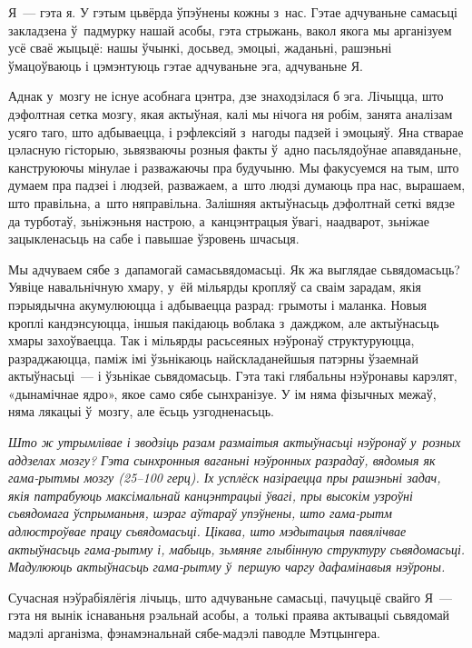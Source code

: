 Я~--- гэта я. У гэтым цьвёрда ўпэўнены кожны з~нас. Гэтае адчуваньне самасьці закладзена ў~падмурку нашай асобы, гэта стрыжань, вакол якога мы арганізуем усё сваё жыцьцё: нашы ўчынкі, досьвед, эмоцыі, жаданьні, рашэньні ўмацоўваюць і цэмэнтуюць гэтае адчуваньне эга, адчуваньне Я.


Аднак у~мозгу не існуе асобнага цэнтра, дзе знаходзілася б эга. Лічыцца, што дэфолтная сетка мозгу, якая актыўная, калі мы нічога ня робім, занята аналізам усяго таго, што адбываецца, і рэфлексіяй з~нагоды падзей і эмоцыяў. Яна стварае цэласную гісторыю, зьвязваючы розныя факты ў~адно пасьлядоўнае апавяданьне, канструюючы мінулае і разважаючы пра будучыню. Мы факусуемся на тым, што думаем пра падзеі і людзей, разважаем, а~што людзі думаюць пра нас, вырашаем, што правільна, а~што няправільна. Залішняя актыўнасьць дэфолтнай сеткі вядзе да турботаў, зьніжэньня настрою, а~канцэнтрацыя ўвагі, наадварот, зьніжае зацыкленасьць на сабе і павышае ўзровень шчасьця.

Мы адчуваем сябе з~дапамогай самасьвядомасьці. Як жа выглядае сьвядомасьць? Уявіце навальнічную хмару, у~ёй мільярды кропляў са сваім зарадам, якія пэрыядычна акумулююцца і адбываецца разрад: грымоты і маланка. Новыя кроплі кандэнсуюцца, іншыя пакідаюць воблака з~дажджом, але актыўнасьць хмары захоўваецца. Так і мільярды расьсеяных нэўронаў структуруюцца, разраджаюцца, паміж імі ўзьнікаюць найскладанейшыя патэрны ўзаемнай актыўнасьці~--- і ўзьнікае сьвядомасьць. Гэта такі глябальны нэўронавы карэлят, «дынамічнае ядро», якое само сябе сынхранізуе. У ім няма фізычных межаў, няма лякацыі ў~мозгу, але ёсьць узгодненасьць.

\emph{Што ж утрымлівае і зводзіць разам размаітыя актыўнасьці нэўронаў у~розных аддзелах мозгу? Гэта сынхронныя ваганьні нэўронных разрадаў, вядомыя як гама-рытмы мозгу (25--100 герц). Іх усплёск назіраецца пры рашэньні задач, якія патрабуюць максімальнай канцэнтрацыі ўвагі, пры высокім узроўні сьвядомага ўспрыманьня, шэраг аўтараў упэўнены, што гама-рытм адлюстроўвае працу сьвядомасьці. Цікава, што мэдытацыя павялічвае актыўнасьць гама-рытму і, мабыць, зьмяняе глыбінную структуру сьвядомасьці. Мадулююць актыўнасьць гама-рытму ў~першую чаргу дафамінавыя нэўроны.}

Сучасная нэўрабіялёгія лічыць, што адчуваньне самасьці, пачуцьцё свайго Я~--- гэта ня вынік існаваньня рэальнай асобы, а~толькі праява актывацыі сьвядомай мадэлі арганізма, фэнамэнальнай сябе-мадэлі паводле Мэтцынгера. 

